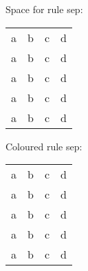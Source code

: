\documentclass{article}
\begin{document}
Space for rule sep:

\begin{tabular}{rrrr}
a&b&c&d\\
\hhline{==~=}
a&b&c&d\\
\hhline{~=~=}
a&b&c&d\\
\hhline{--~-}
a&b&c&d\\
\hhline{~---}
a&b&c&d
\end{tabular}


Coloured rule sep:


\begin{tabular}{rrrr}
a&b&c&d\\
\hhline{==~=}
a&b&c&d\\
\hhline{~=~=}
a&b&c&d\\
\hhline{--~-}
a&b&c&d\\
\hhline{~---}
a&b&c&d
\end{tabular}
\end{document}
